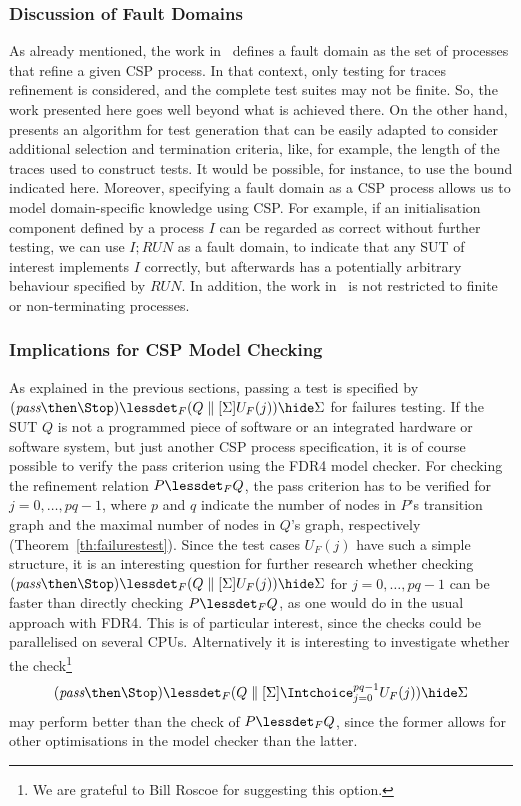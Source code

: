 \subsubsection*{Discussion of Fault Domains}
As already mentioned, the work in~\cite{DBLP:conf/pts/CavalcantiS17} defines
a fault domain as the set of processes that refine a given CSP process.  In
that context, only testing for traces refinement is considered, and the
complete test suites may not be finite. So, the work presented here goes well
beyond what is achieved there. On the other hand,
\cite{DBLP:conf/pts/CavalcantiS17} presents an algorithm for test generation
that can be easily adapted to consider additional selection and termination
criteria, like, for example, the length of the traces used to construct
tests. It would be possible, for instance, to use the bound indicated here.
Moreover, specifying a fault domain as a CSP process allows us to model
domain-specific knowledge using CSP. For example, if an initialisation
component defined by a process $I$ can be regarded as correct without further
testing, we can use $I; RUN$ as a fault domain, to indicate that any SUT of
interest implements $I$ correctly, but afterwards has a potentially arbitrary
behaviour specified by $RUN$. In addition, the work
in~\cite{DBLP:conf/pts/CavalcantiS17} is not restricted to finite or
non-terminating processes.

\subsubsection*{Implications for CSP Model Checking}
As explained in the previous sections, passing a test is specified by
$(\epass\then\Stop) \lessdet_F (Q\parallel[\Sigma] U_F(j)) \hide \Sigma$ for
failures testing. If the SUT $Q$ is not a programmed piece of software or an
integrated hardware or software system, but just another CSP process
specification, it is of course possible to verify the pass criterion using
the FDR4 model checker. For checking the refinement relation $P\lessdet_F Q$,
the pass criterion has to be verified for $j=0,\dots,pq-1$, where $p$ and $q$
indicate the number of nodes in $P$'s transition graph and the maximal number
of nodes in $Q$'s graph, respectively (Theorem~\ref{th:failurestest}). Since
the test cases $U_F(j)$ have such a simple structure, it is an interesting
question for further research whether checking $(\epass\then\Stop) \lessdet_F
(Q\parallel[\Sigma] U_F(j)) \hide \Sigma$ for $j=0,\dots,pq-1$ can be faster
than directly checking $P\lessdet_F Q$, as one would do in the usual approach
with FDR4. This is of particular interest, since the checks could be
parallelised on several CPUs. Alternatively it is interesting to investigate
whether the check\footnote{We are grateful to Bill Roscoe for suggesting this
option.}
\[
(\epass\then\Stop) \lessdet_F (Q\parallel[\Sigma] \Intchoice_{j=0}^{pq-1} U_F(j)) \hide \Sigma
\]
may perform better than the check of $P\lessdet_F Q$, since the former allows for
other optimisations in the model checker than the latter.

